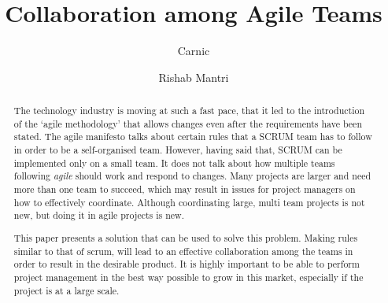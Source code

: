 \documentclass[sigconf]{acmart}
\begin{document}
%
\title{Collaboration among Agile Teams}

%
\author{Carnic}

\author{Rishab Mantri}


%
\begin{abstract}
The technology industry is moving at such a fast pace, that it led to the introduction of the ‘agile methodology’ that allows changes even after the requirements have been stated. The agile manifesto talks about certain rules that a SCRUM team has to follow in order to be a self-organised team. However, having said that, SCRUM can be implemented only on a small team. It does not talk about how multiple teams following \textit {agile} should work and respond to changes. Many projects are larger and need more than one team to succeed, which may result in issues for project managers on how to effectively coordinate. Although coordinating large, multi team projects is not new, but doing it in agile projects is new. 


This paper presents a solution that can be used to solve this problem. Making rules similar to that of scrum, will lead to an effective collaboration among the teams in order to result in the desirable product. It is highly important to be able to perform project management in the best way possible to grow in this market, especially if the project is at a large scale.
\end{abstract}


%

%
\end{document}
